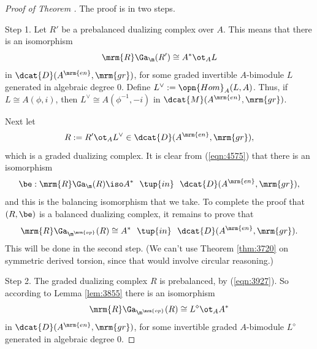 \begin{proof}[Proof of Theorem \tup{\ref{thm:3781}}]
The proof is in two steps. 

\smallskip \noindent 
Step 1. Let $R'$ be a prebalanced dualizing complex over $A$. 
This means that there is an isomorphism 
\begin{equation} \label{eqn:4575}
\mrm{R} \Ga_{\m}(R') \cong A^* \ot_A L 
\end{equation}
in $\dcat{D}(A^{\mrm{en}}, \mrm{gr})$, for some 
graded invertible $A$-bimodule $L$ generated in algebraic degree $0$. Define 
$L^{\vee} := \opn{Hom}_A(L, A)$. Thus, if $L \cong A(\phi, i)$, then 
$L^{\vee} \cong A(\phi^{-1}, -i)$ in $\dcat{M}(A^{\mrm{en}}, \mrm{gr})$.

Next let 
\begin{equation} \label{eqn:3929}
R := R'  \ot_A L^{\vee} \in \dcat{D}(A^{\mrm{en}}, \mrm{gr}) ,
\end{equation}
which is a graded dualizing complex. 
It is clear from (\ref{eqn:4575}) that there is an isomorphism 
\begin{equation} \label{eqn:3927}
\be : \mrm{R} \Ga_{\m}(R) \iso A^* \ \ \tup{in} \ \  
\dcat{D}(A^{\mrm{en}}, \mrm{gr}) ,
\end{equation}
and this is the balancing isomorphism that we take. 
To complete the proof that $(R, \be)$ is a balanced dualizing complex, it 
remains to prove that 
\begin{equation} \label{eqn:3925}
\mrm{R} \Ga_{\m^{\mrm{op}}}(R) \cong A^*
\ \ \tup{in} \ \ \dcat{D}(A^{\mrm{en}}, \mrm{gr}) .
\end{equation}
This will be done in the second step. 
(We can't use Theorem \ref{thm:3720} on symmetric derived torsion, since  
that would involve circular reasoning.)

\medskip \noindent 
Step 2. The graded dualizing complex $R$ is prebalanced, by (\ref{eqn:3927}). 
So according to Lemma \ref{lem:3855} there is an isomorphism 
\begin{equation} \label{eqn:3928}
\mrm{R} \Ga_{\m^{\mrm{op}}}(R) \cong L^{\diamond} \ot_A A^* 
\end{equation}
in $\dcat{D}(A^{\mrm{en}}, \mrm{gr})$, for some 
invertible graded $A$-bimodule $L^{\diamond}$ generated in algebraic degree 
$0$. 


\end{proof}
